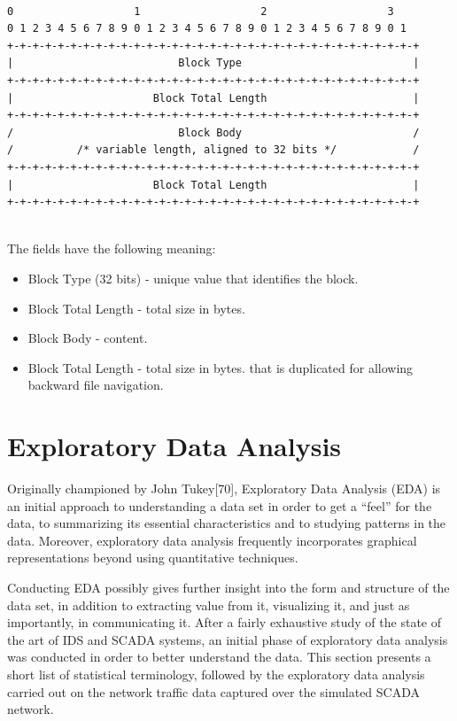 \documentclass[11pt,]{article}
\begin{document}
\begin{verbatim}

0                   1                   2                   3
0 1 2 3 4 5 6 7 8 9 0 1 2 3 4 5 6 7 8 9 0 1 2 3 4 5 6 7 8 9 0 1
+-+-+-+-+-+-+-+-+-+-+-+-+-+-+-+-+-+-+-+-+-+-+-+-+-+-+-+-+-+-+-+-+
|                          Block Type                           |
+-+-+-+-+-+-+-+-+-+-+-+-+-+-+-+-+-+-+-+-+-+-+-+-+-+-+-+-+-+-+-+-+
|                      Block Total Length                       |
+-+-+-+-+-+-+-+-+-+-+-+-+-+-+-+-+-+-+-+-+-+-+-+-+-+-+-+-+-+-+-+-+
/                          Block Body                           /
/          /* variable length, aligned to 32 bits */            /
+-+-+-+-+-+-+-+-+-+-+-+-+-+-+-+-+-+-+-+-+-+-+-+-+-+-+-+-+-+-+-+-+
|                      Block Total Length                       |
+-+-+-+-+-+-+-+-+-+-+-+-+-+-+-+-+-+-+-+-+-+-+-+-+-+-+-+-+-+-+-+-+    
    
\end{verbatim}

The fields have the following meaning:

\begin{itemize}
\itemsep1pt\parskip0pt
\item
  Block Type (32 bits) - unique value that identifies the block.
\item
  Block Total Length - total size in bytes.
\item
  Block Body - content.
\item
  Block Total Length - total size in bytes. that is duplicated for
  allowing backward file navigation.
\end{itemize}

\newpage

\section{Exploratory Data Analysis}\label{exploratory-data-analysis}

Originally championed by John Tukey{[}70{]}, Exploratory Data Analysis
(EDA) is an initial approach to understanding a data set in order to get
a ``feel'' for the data, to summarizing its essential characteristics
and to studying patterns in the data. Moreover, exploratory data
analysis frequently incorporates graphical representations beyond using
quantitative techniques.

Conducting EDA possibly gives further insight into the form and
structure of the data set, in addition to extracting value from it,
visualizing it, and just as importantly, in communicating it. After a
fairly exhaustive study of the state of the art of IDS and SCADA
systems, an initial phase of exploratory data analysis was conducted in
order to better understand the data. This section presents a short list
of statistical terminology, followed by the exploratory data analysis
carried out on the network traffic data captured over the simulated
SCADA network.
\end{document}
